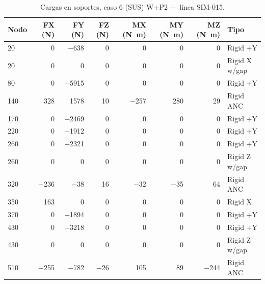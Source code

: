 \begin{table}[htbp]
  \centering
  \footnotesize
  \caption{Cargas en soportes, caso 6 (SUS) W+P2 — línea SIM-015.}
  \label{tab:restricciones-sus}
  \begin{tabular}{lrrrrrrl}
    \toprule
    Nodo & FX (\si{N}) & FY (\si{N}) & FZ (\si{N}) & MX (\si{N.m}) & MY (\si{N.m}) & MZ (\si{N.m}) & Tipo \\
    \midrule
    20 & \num{0} & \num{-638} & \num{0} & \num{0} & \num{0} & \num{0} & Rigid +Y \\
    20 & \num{0} & \num{0} & \num{0} & \num{0} & \num{0} & \num{0} & Rigid X w/gap \\
    80 & \num{0} & \num{-5915} & \num{0} & \num{0} & \num{0} & \num{0} & Rigid +Y \\
    140 & \num{328} & \num{1578} & \num{10} & \num{-257} & \num{280} & \num{29} & Rigid ANC \\
    170 & \num{0} & \num{-2469} & \num{0} & \num{0} & \num{0} & \num{0} & Rigid +Y \\
    220 & \num{0} & \num{-1912} & \num{0} & \num{0} & \num{0} & \num{0} & Rigid +Y \\
    260 & \num{0} & \num{-2321} & \num{0} & \num{0} & \num{0} & \num{0} & Rigid +Y \\
    260 & \num{0} & \num{0} & \num{0} & \num{0} & \num{0} & \num{0} & Rigid Z w/gap \\
    320 & \num{-236} & \num{-38} & \num{16} & \num{-32} & \num{-35} & \num{64} & Rigid ANC \\
    350 & \num{163} & \num{0} & \num{0} & \num{0} & \num{0} & \num{0} & Rigid X \\
    370 & \num{0} & \num{-1894} & \num{0} & \num{0} & \num{0} & \num{0} & Rigid +Y \\
    430 & \num{0} & \num{-3218} & \num{0} & \num{0} & \num{0} & \num{0} & Rigid +Y \\
    430 & \num{0} & \num{0} & \num{0} & \num{0} & \num{0} & \num{0} & Rigid Z w/gap \\
    510 & \num{-255} & \num{-782} & \num{-26} & \num{105} & \num{89} & \num{-244} & Rigid ANC \\
    \bottomrule
  \end{tabular}
\end{table}
